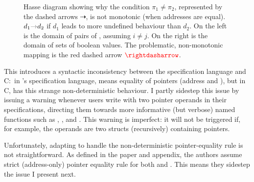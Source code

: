 \begin{figure}
%
\caption{Hasse diagram showing why the condition {\color{red}$\pi_1 \neq \pi_2$},
    represented by the dashed arrows $\rightdasharrow$, is not monotonic (when
    addresses are equal). $d_1 {\color{gray}\rightarrow} d_2$ if $d_1$ leads to
    more undefined behaviour than $d_2$. On the left is the domain of pairs of
    , assuming $i \neq j$. On the right is the domain of sets of
    boolean values. The problematic, non-monotonic mapping is the red dashed
    arrow $\color{red}\rightdasharrow$.}\label{fig:ptr-eq-hasse}
\end{figure}

This introduces a syntactic inconsistency between the specification language
and C:\ in 's specification language, \cninline{==} means equality of
pointers (address and ), but in C, \cinline{==} has this strange
non-deterministic behaviour. I partly sidestep this issue by issuing a warning
whenever users write \cninline{==} with two pointer operands in their
specifications, directing them towards more informative (but verbose) named
functions such as , , and
. This warning is imperfect: it will not be triggered if, for
example, the operands are two structs (recursively) containing pointers.

Unfortunately, adapting  to handle the non-deterministic
pointer-equality rule is not straightforward. As defined in the paper and
appendix, the authors assume strict (address-only) pointer equality rule for both
 and . This means they sidestep the issue I present
next.

